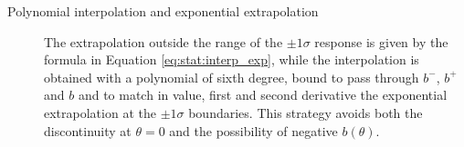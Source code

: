 \begin{description}
\item[Polynomial interpolation and exponential extrapolation] The extrapolation outside the range of the $\pm 1 \sigma$ response is given by the formula in Equation \ref{eq:stat:interp_exp}, while the interpolation is obtained with a polynomial of sixth degree, bound to pass through $b^-$, $b^+$ and $b$ and to match in value, first and second derivative the exponential extrapolation at the $\pm 1 \sigma$ boundaries. This strategy avoids both the discontinuity at $\theta=0$ and the possibility of negative $b(\theta)$.

\end{description}

\begin{figure}[hbt]
\centering 
{}

\end{figure}
